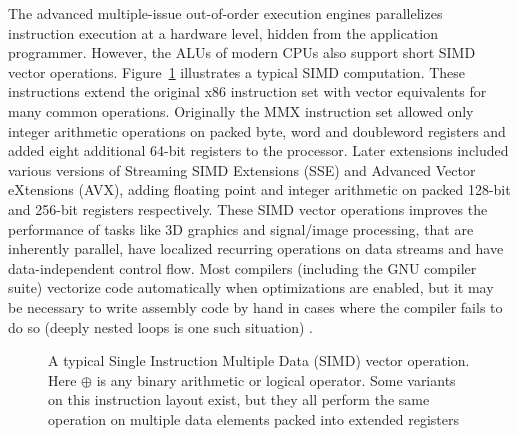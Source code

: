 The advanced multiple-issue out-of-order execution engines parallelizes instruction execution at a hardware level, hidden from the application programmer. However, the ALUs of modern CPUs also support short 
SIMD vector operations. Figure~\ref{fig_SIMD} illustrates a typical SIMD computation. These instructions extend the original x86 instruction set with vector equivalents for many common operations. Originally
the MMX instruction set allowed only integer arithmetic operations on packed byte, word and doubleword registers and added eight additional 64-bit registers to the processor. Later extensions included 
various versions of Streaming SIMD Extensions (SSE) and Advanced Vector eXtensions (AVX), adding floating point and integer arithmetic on packed 128-bit and 256-bit registers respectively. These
SIMD vector operations improves the performance of tasks like 3D graphics and signal/image processing, that are inherently parallel, have localized recurring operations on data streams and have data-independent 
control flow. Most compilers (including the GNU compiler suite) vectorize code automatically when optimizations are enabled, but it may be necessary to write assembly code by hand in cases where the compiler fails
to do so (deeply nested loops is one such situation) \cite{intelArch}.
\begin{figure}[ht!]
 \begin{mdframed}
 \centering
 \caption[Vector operation]{A typical Single Instruction Multiple Data (SIMD) vector operation. Here $\oplus$ is any binary arithmetic or logical operator. Some variants on this instruction layout exist, but they all perform the same operation
			    on multiple data elements packed into extended registers}
 \label{fig_SIMD}
 \end{mdframed}
\end{figure}

